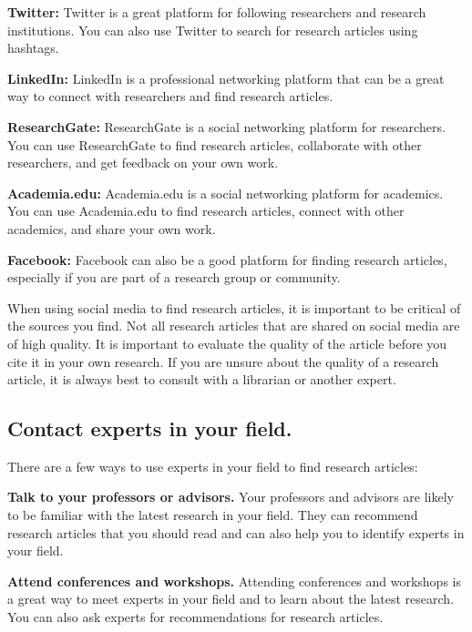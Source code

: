 \documentclass[
]{book}
\begin{document}
\textbf{Twitter:} Twitter is a great platform for following researchers and research institutions. You can also use Twitter to search for research articles using hashtags.

\textbf{LinkedIn:} LinkedIn is a professional networking platform that can be a great way to connect with researchers and find research articles.

\textbf{ResearchGate:} ResearchGate is a social networking platform for researchers. You can use ResearchGate to find research articles, collaborate with other researchers, and get feedback on your own work.

\textbf{Academia.edu:} Academia.edu is a social networking platform for academics. You can use Academia.edu to find research articles, connect with other academics, and share your own work.

\textbf{Facebook:} Facebook can also be a good platform for finding research articles, especially if you are part of a research group or community.

When using social media to find research articles, it is important to be critical of the sources you find. Not all research articles that are shared on social media are of high quality. It is important to evaluate the quality of the article before you cite it in your own research. If you are unsure about the quality of a research article, it is always best to consult with a librarian or another expert.

\hypertarget{contact-experts-in-your-field.}{%
\subsection*{Contact experts in your field.}\label{contact-experts-in-your-field.}}

There are a few ways to use experts in your field to find research articles:

\textbf{Talk to your professors or advisors.} Your professors and advisors are likely to be familiar with the latest research in your field. They can recommend research articles that you should read and can also help you to identify experts in your field.

\textbf{Attend conferences and workshops.} Attending conferences and workshops is a great way to meet experts in your field and to learn about the latest research. You can also ask experts for recommendations for research articles.
\end{document}
